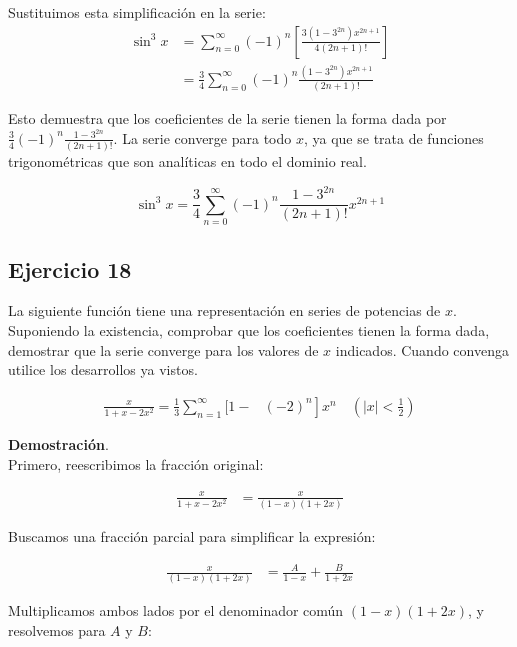 \documentclass{article}
\begin{document}
    Sustituimos esta simplificación en la serie:
    \begin{align*}
    \sin^3 x &= \sum_{n=0}^{\infty} (-1)^n \left[\frac{3 (1 - 3^{2n}) x^{2n+1}}{4 (2n+1)!}\right] \\
    &= \frac{3}{4} \sum_{n=0}^{\infty} (-1)^n \frac{(1 - 3^{2n}) x^{2n+1}}{(2n+1)!}
    \end{align*}

    Esto demuestra que los coeficientes de la serie tienen la forma dada por \( \frac{3}{4} (-1)^n \frac{1 - 3^{2n}}{(2n+1)!} \). La serie converge para todo \( x \), ya que se trata de funciones trigonométricas que son analíticas en todo el dominio real.

    \[
    \sin^3 x = \frac{3}{4} \sum_{n=0}^{\infty} (-1)^n \frac{1-3^{2n}}{(2n+1)!} x^{2n+1}
    \]

    \subsection*{Ejercicio 18}

    La siguiente función tiene una representación en series de potencias de $x$. Suponiendo la existencia, comprobar que los coeficientes tienen la forma dada, demostrar que la serie converge para los valores de $x$ indicados. Cuando convenga utilice los desarrollos ya vistos.

    $$
    \begin{aligned}
    \frac{x}{1+x-2 x^{2}}=\frac{1}{3} \sum_{n=1}^{\infty}[1- & \left.(-2)^{n}\right] x^{n} \quad\left(|x|<\frac{1}{2}\right)
    \end{aligned}
    $$

    \textbf{Demostración}.\\

    Primero, reescribimos la fracción original:

    \begin{align*}
    \frac{x}{1+x-2 x^{2}}
    &= \frac{x}{(1-x)(1+2 x)}
    \end{align*}

    Buscamos una fracción parcial para simplificar la expresión:

    \begin{align*}
    \frac{x}{(1-x)(1+2 x)}
    &= \frac{A}{1-x} + \frac{B}{1+2 x}
    \end{align*}

    Multiplicamos ambos lados por el denominador común $(1-x)(1+2x)$, y resolvemos para $A$ y $B$:
\end{document}
